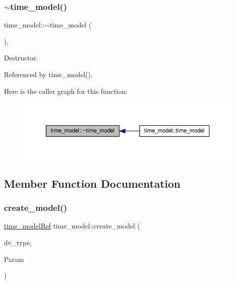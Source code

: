 \subsubsection{\texorpdfstring{$\sim$time\+\_\+model()}{~time\_model()}}
{\footnotesize\ttfamily time\+\_\+model\+::$\sim$time\+\_\+model (\begin{DoxyParamCaption}{ }\end{DoxyParamCaption})\hspace{0.3cm}{\ttfamily [virtual]}, {\ttfamily [default]}}



Destructor. 



Referenced by time\+\_\+model().

Here is the caller graph for this function\+:
\nopagebreak
\begin{figure}[H]
\begin{center}
\leavevmode
\includegraphics[width=350pt]{d3/d73/classtime__model_a4067a65b6c76225fb9c949d471532653_icgraph}
\end{center}
\end{figure}


\subsection{Member Function Documentation}
\mbox{\label{classtime__model_a91cd4bf13a96b80a8168281a95a34eca}} 
\subsubsection{\texorpdfstring{create\+\_\+model()}{create\_model()}}
{\footnotesize\ttfamily \hyperlink{time__model_8hpp_ae203bb7faf1c278333f76fcc6ebe412c}{time\+\_\+model\+Ref} time\+\_\+model\+::create\+\_\+model (\begin{DoxyParamCaption}\item[{\hyperlink{target__device_8hpp_a476becc690220f0805ce73006449c732}{Target\+Device\+\_\+\+Type}}]{dv\+\_\+type,  }\item[{const \hyperlink{Parameter_8hpp_a37841774a6fcb479b597fdf8955eb4ea}{Parameter\+Const\+Ref}}]{Param }\end{DoxyParamCaption})\hspace{0.3cm}{\ttfamily [static]}}



